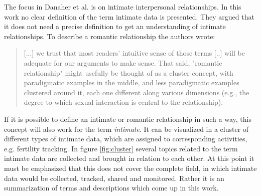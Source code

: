 The focus in Danaher et al. \cite{doi:10.1080/15265161.2017.1409823} is on intimate interpersonal relationships. In this work no clear definition of the term intimate data is presented. They argued that it does not need a precise definition to get an understanding of intimate relationships. To describe a romantic relationship the authors wrote:

\begin{quote}
	[...] we trust that most readers' intuitive sense of those terms [..] will be adequate for our arguments to make sense. That said, "romantic relationship" might usefully be thought of as a cluster concept, with paradigmatic examples in the middle, and less paradigmatic examples clustered around it, each one different along various dimensions (e.g., the degree to which sexual interaction is central to the relationship).
\end{quote}

If it is possible to define an intimate or romantic relationship in such a way, this concept will also work for the term \textit{intimate}. 
It can be visualized in a cluster of different types of intimate data, which are assigned to corresponding activities, e.g. fertility tracking.
In figure \ref{fig:cluster} several topics related to the term intimate data are collected and brought in relation to each other. At this point it must be emphasized that this does not cover the complete field, in which intimate data would be collected, tracked, shared and monitored. Rather it is an summarization of terms and descriptions which come up in this work.



